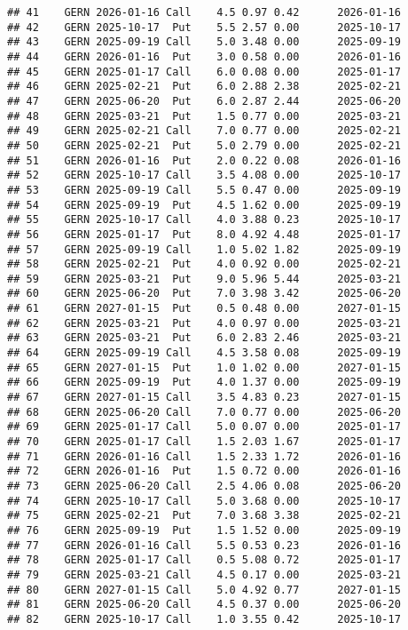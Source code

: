 \documentclass[
]{article}
\begin{document}
\begin{verbatim}
## 41    GERN 2026-01-16 Call    4.5 0.97 0.42      2026-01-16
## 42    GERN 2025-10-17  Put    5.5 2.57 0.00      2025-10-17
## 43    GERN 2025-09-19 Call    5.0 3.48 0.00      2025-09-19
## 44    GERN 2026-01-16  Put    3.0 0.58 0.00      2026-01-16
## 45    GERN 2025-01-17 Call    6.0 0.08 0.00      2025-01-17
## 46    GERN 2025-02-21  Put    6.0 2.88 2.38      2025-02-21
## 47    GERN 2025-06-20  Put    6.0 2.87 2.44      2025-06-20
## 48    GERN 2025-03-21  Put    1.5 0.77 0.00      2025-03-21
## 49    GERN 2025-02-21 Call    7.0 0.77 0.00      2025-02-21
## 50    GERN 2025-02-21  Put    5.0 2.79 0.00      2025-02-21
## 51    GERN 2026-01-16  Put    2.0 0.22 0.08      2026-01-16
## 52    GERN 2025-10-17 Call    3.5 4.08 0.00      2025-10-17
## 53    GERN 2025-09-19 Call    5.5 0.47 0.00      2025-09-19
## 54    GERN 2025-09-19  Put    4.5 1.62 0.00      2025-09-19
## 55    GERN 2025-10-17 Call    4.0 3.88 0.23      2025-10-17
## 56    GERN 2025-01-17  Put    8.0 4.92 4.48      2025-01-17
## 57    GERN 2025-09-19 Call    1.0 5.02 1.82      2025-09-19
## 58    GERN 2025-02-21  Put    4.0 0.92 0.00      2025-02-21
## 59    GERN 2025-03-21  Put    9.0 5.96 5.44      2025-03-21
## 60    GERN 2025-06-20  Put    7.0 3.98 3.42      2025-06-20
## 61    GERN 2027-01-15  Put    0.5 0.48 0.00      2027-01-15
## 62    GERN 2025-03-21  Put    4.0 0.97 0.00      2025-03-21
## 63    GERN 2025-03-21  Put    6.0 2.83 2.46      2025-03-21
## 64    GERN 2025-09-19 Call    4.5 3.58 0.08      2025-09-19
## 65    GERN 2027-01-15  Put    1.0 1.02 0.00      2027-01-15
## 66    GERN 2025-09-19  Put    4.0 1.37 0.00      2025-09-19
## 67    GERN 2027-01-15 Call    3.5 4.83 0.23      2027-01-15
## 68    GERN 2025-06-20 Call    7.0 0.77 0.00      2025-06-20
## 69    GERN 2025-01-17 Call    5.0 0.07 0.00      2025-01-17
## 70    GERN 2025-01-17 Call    1.5 2.03 1.67      2025-01-17
## 71    GERN 2026-01-16 Call    1.5 2.33 1.72      2026-01-16
## 72    GERN 2026-01-16  Put    1.5 0.72 0.00      2026-01-16
## 73    GERN 2025-06-20 Call    2.5 4.06 0.08      2025-06-20
## 74    GERN 2025-10-17 Call    5.0 3.68 0.00      2025-10-17
## 75    GERN 2025-02-21  Put    7.0 3.68 3.38      2025-02-21
## 76    GERN 2025-09-19  Put    1.5 1.52 0.00      2025-09-19
## 77    GERN 2026-01-16 Call    5.5 0.53 0.23      2026-01-16
## 78    GERN 2025-01-17 Call    0.5 5.08 0.72      2025-01-17
## 79    GERN 2025-03-21 Call    4.5 0.17 0.00      2025-03-21
## 80    GERN 2027-01-15 Call    5.0 4.92 0.77      2027-01-15
## 81    GERN 2025-06-20 Call    4.5 0.37 0.00      2025-06-20
## 82    GERN 2025-10-17 Call    1.0 3.55 0.42      2025-10-17

\end{verbatim}
\end{document}
